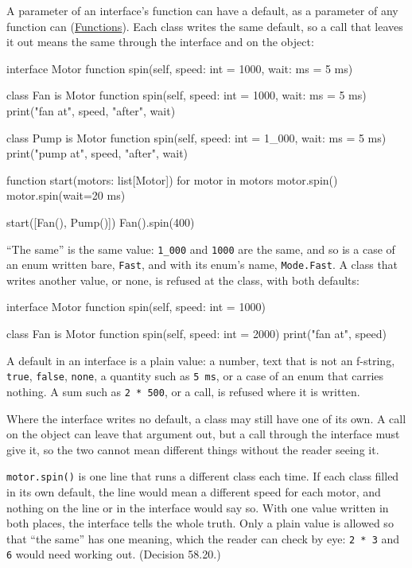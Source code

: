 A parameter of an interface's function can have a default, as a
parameter of any function can (\hyperref[ch-functions]{Functions}).
Each class writes the same default, so a call that leaves it out
means the same through the interface and on the object:

\begin{zeno}[file=motors.zeno, dir=defaults]
interface Motor {
    function spin(self, speed: int = 1000, wait: ms = 5 ms)
}

class Fan is Motor {
    function spin(self, speed: int = 1000, wait: ms = 5 ms) {
        print("fan at", speed, "after", wait)
    }
}

class Pump is Motor {
    function spin(self, speed: int = 1_000, wait: ms = 5 ms) {
        print("pump at", speed, "after", wait)
    }
}

function start(motors: list[Motor]) {
    for motor in motors {
        motor.spin()
        motor.spin(wait=20 ms)
    }
}

start([Fan(), Pump()])
Fan().spin(400)
\end{zeno}

``The same'' is the same value: \verb|1_000| and \verb|1000| are the
same, and so is a case of an enum written bare, \verb|Fast|, and with
its enum's name, \verb|Mode.Fast|. A class that writes
another value, or none, is refused at the class, with both defaults:

\begin{zeno}[fails=yes]
interface Motor {
    function spin(self, speed: int = 1000)
}

class Fan is Motor {
    function spin(self, speed: int = 2000) {
        print("fan at", speed)
    }
}
\end{zeno}

A default in an interface is a plain value: a number, text that is
not an f-string, \verb|true|, \verb|false|, \verb|none|, a quantity
such as \verb|5 ms|, or a case of an enum that carries nothing. A sum
such as \verb|2 * 500|, or a call, is refused where it is written.

Where the interface writes no default, a class may still have one of
its own. A call on the object can leave that argument out, but a call
through the interface must give it, so the two cannot mean different
things without the reader seeing it.

\begin{why}
\verb|motor.spin()| is one line that runs a different class each
time. If each class filled in its own default, the line would mean a
different speed for each motor, and nothing on the line or in the
interface would say so. With one value written in both places, the
interface tells the whole truth. Only a plain value is allowed so that
``the same'' has one meaning, which the reader can check by eye:
\verb|2 * 3| and \verb|6| would need working out. (Decision 58.20.)
\end{why}

